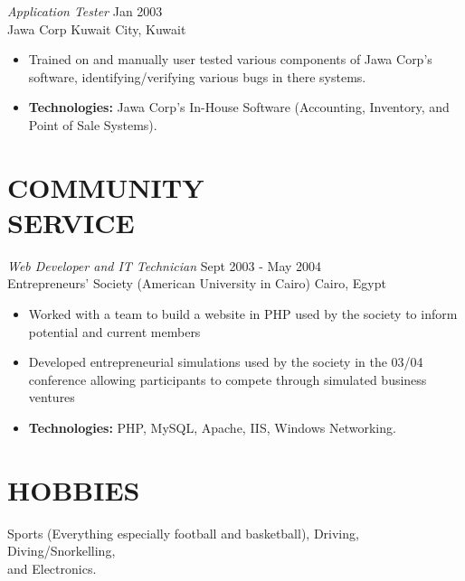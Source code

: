 \documentclass[line,margin]{res}
\begin{document}
\begin{resume}
    {\sl Application Tester} \hfill Jan 2003 \\
    Jawa Corp \hfill Kuwait City, Kuwait \smallskip
        \begin{itemize}  \itemsep -2pt %
    \item Trained on and manually user tested various components of Jawa
    Corp's \\ software, identifying/verifying various bugs in there
    systems.
    \item {\bf Technologies:} \hspace{1pt}
        Jawa Corp's In-House Software (Accounting, Inventory, and \newline
        \hspace*{72pt} Point of Sale Systems).
        \end{itemize}

\section{COMMUNITY \\ SERVICE}
    {\sl Web Developer and IT Technician} \hfill Sept 2003 - May 2004 \\
    Entrepreneurs' Society (American University in Cairo) \hfill Cairo, Egypt \smallskip
        \begin{itemize}  \itemsep -2pt %
\item Worked with a team to build a website in PHP used by the society to
    inform potential and current members
\item Developed entrepreneurial simulations used by the society in the 
    03/04 \\ conference allowing participants to compete through simulated 
    business \\ ventures
    \item {\bf Technologies:} \hspace{1pt}
        PHP, MySQL, Apache, IIS, Windows Networking.
        \end{itemize}

\section{HOBBIES}
    Sports (Everything especially football and basketball), Driving,
    Diving/Snorkelling, \\ and Electronics.
 

\end{resume}
\end{document}
